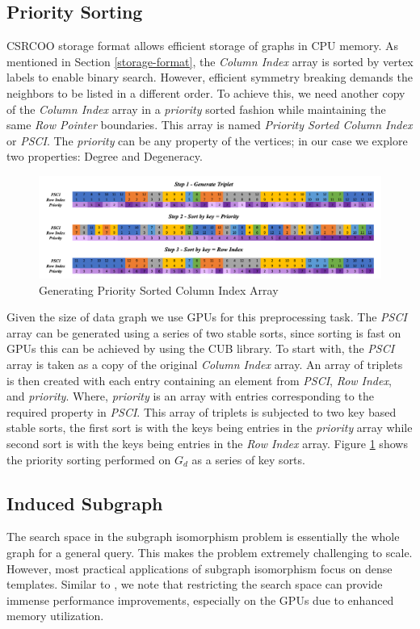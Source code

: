 \subsection{Priority Sorting}\label{sec:prio-sorting}
CSRCOO storage format allows efficient storage of graphs in CPU memory.
As mentioned in Section \ref{storage-format}, the \textit{Column Index} array is sorted by vertex labels to enable binary search.
However, efficient symmetry breaking demands the neighbors to be listed in a different order.
To achieve this, we need another copy of the \textit{Column Index} array in a \textit{priority} sorted fashion while maintaining the same \textit{Row Pointer} boundaries. This array is named \textit{Priority Sorted Column Index} or \textit{PSCI}.
The \textit{priority} can be any property of the vertices; in our case we explore two properties: Degree and Degeneracy.
\begin{figure}
    \includegraphics[width=\textwidth]{fig/LR/prio-sorting.png}
    \caption{Generating Priority Sorted Column Index Array}
    \label{fig:prio-sorting}
\end{figure}
Given the size of data graph we use GPUs for this preprocessing task.
The \textit{PSCI} array can be generated using a series of two stable sorts, since sorting is fast on GPUs this can be achieved by using the CUB library.
To start with, the \textit{PSCI} array is taken as a copy of the original \textit{Column Index} array.
An array of triplets is then created with each entry containing an element from \textit{PSCI}, \textit{Row Index}, and \textit{priority}. Where, \textit{priority} is an array with entries corresponding to the required property in \textit{PSCI}.
This array of triplets is subjected to two key based stable sorts, the first sort is with the keys being entries in the \textit{priority} array while second sort is with the keys being entries in the \textit{Row Index} array. Figure \ref{fig:prio-sorting} shows the priority sorting performed on $G_d$ as a series of key sorts.

\subsection{Induced Subgraph}\label{encoding}
The search space in the subgraph isomorphism problem is essentially the whole graph for a general query.
This makes the problem extremely challenging to scale.
However, most practical applications of subgraph isomorphism focus on dense templates.
Similar to \cite{mohammad_K-clique}, we note that restricting the search space can provide immense performance improvements, especially on the GPUs due to enhanced memory utilization.

